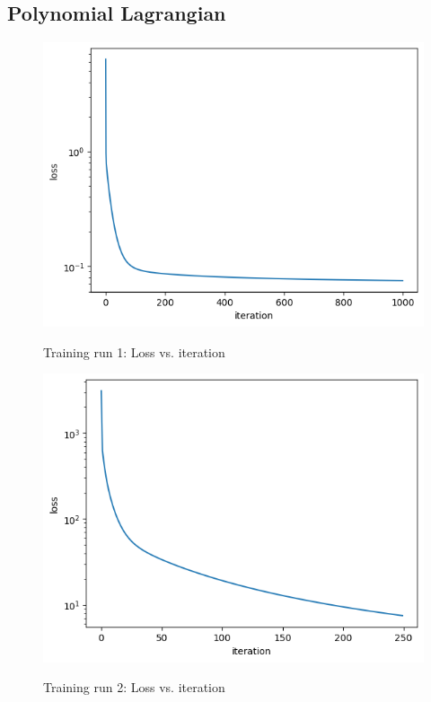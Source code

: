 \documentclass[]{article}
\begin{document}
\begin{appendices}
\subsection{Polynomial Lagrangian}

\begin{figure}[H]
	\caption{Training run 1: Loss vs. iteration}
	\centering
	\includegraphics[scale=0.60]{poly-loss-training-1.png}
	\label{fig:poly-loss-training-1}
\end{figure}

\begin{figure}[H]
	\caption{Training run 2: Loss vs. iteration}
	\centering
	\includegraphics[scale=0.60]{poly-loss-training-2.png}
	\label{fig:poly-loss-training-2}
\end{figure}


\end{appendices}
\end{document}
